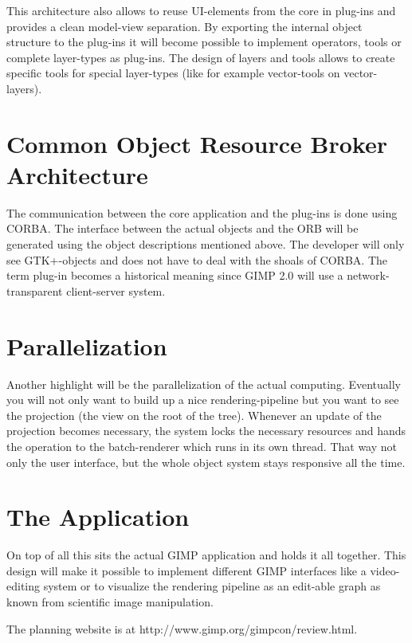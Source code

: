 This architecture also allows to reuse UI-elements from the core in
plug-ins and provides a clean model-view separation. By exporting the
internal object structure to the plug-ins it will become possible to
implement operators, tools or complete layer-types as plug-ins. The
design of layers and tools allows to create specific tools for special
layer-types (like for example vector-tools on vector-layers).

\section{Common Object Resource Broker Architecture}

The communication between the core application and the plug-ins is
done using CORBA. The interface between the actual objects and the ORB
will be generated using the object descriptions mentioned above. The
developer will only see GTK+-objects and does not have to deal with
the shoals of CORBA. The term plug-in becomes a historical meaning
since GIMP 2.0 will use a network-transparent client-server system.

\section{Parallelization}

Another highlight will be the parallelization of the actual computing.
Eventually you will not only want to build up a nice
rendering-pipeline but you want to see the projection (the view on the
root of the tree). Whenever an update of the projection becomes
necessary, the system locks the necessary resources and hands the
operation to the batch-renderer which runs in its own thread. That way
not only the user interface, but the whole object system stays
responsive all the time.

\section{The Application}
On top of all this sits the actual GIMP application and holds it all
together.  This design will make it possible to implement different
GIMP interfaces like a video-editing system or to visualize the
rendering pipeline as an edit-able graph as known from scientific
image manipulation.

The planning website is at http://www.gimp.org/gimpcon/review.html.
 
